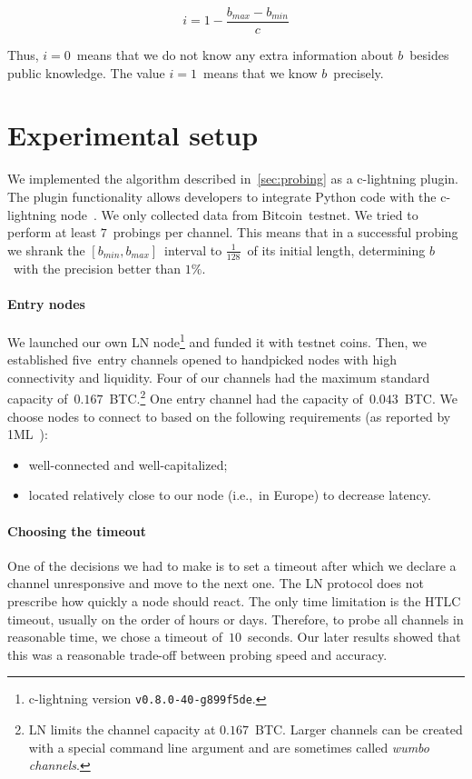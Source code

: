 \[i = 1 - \frac{b_{max} - b_{min}}{c}\]

Thus, $i = 0$~means that we do not know any extra information about $b$~besides public knowledge.
The value $i = 1$~means that we know $b$~precisely.


\section{Experimental setup}

We implemented the algorithm described in~\cref{sec:probing} as a c-lightning plugin.
The plugin functionality allows developers to integrate Python code with the c-lightning node~\cite{clightningPlugins}.
We only collected data from Bitcoin~testnet.
We tried to perform at least $7$~probings per channel.
This means that in a successful probing we shrank the $[b_{min}, b_{max}]$~interval to $\frac{1}{128}$~of its initial length, determining $b$~with the precision better than $1\%$.

\paragraph{Entry nodes}
We launched our own LN node\footnote{c-lightning version \texttt{v0.8.0-40-g899f5de}.} and funded it with testnet coins.
Then, we established five~entry channels opened to handpicked nodes with high connectivity and liquidity.
Four of our channels had the maximum standard capacity of~$0.167$~BTC\@.\footnote{LN limits the channel capacity at $0.167$~BTC\@. Larger channels can be created with a special command line argument and are sometimes called \textit{wumbo channels}.}
One entry channel had the capacity of~$0.043$~BTC\@.
We choose nodes to connect to based on the following requirements (as reported by 1ML~\cite{1MLTopConnected}):
\begin{itemize}
	\item well-connected and well-capitalized;
	\item located relatively close to our node (i.e.,~in Europe) to decrease latency.
\end{itemize}

\paragraph{Choosing the timeout}
One of the decisions we had to make is to set a timeout after which we declare a channel unresponsive and move to the next one.
The LN protocol does not prescribe how quickly a node should react.
The only time limitation is the HTLC timeout, usually on the order of hours or days.
Therefore, to probe all channels in reasonable time, we chose a timeout of~$10$~seconds.
Our later results showed that this was a reasonable trade-off between probing speed and accuracy.

